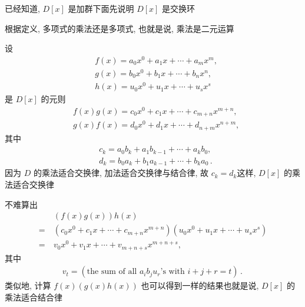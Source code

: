 \begin{pf}
    已经知道, $D[x]$ 是加群\period 下面先说明 $D[x]$ 是交换环\period

    根据定义, 多项式的乘法还是多项式, 也就是说, 乘法是二元运算\period

    设
    \begin{align*}
         & f(x) = a_0 x^0 + a_1 x + \cdots + a_m x^m, \\
         & g(x) = b_0 x^0 + b_1 x + \cdots + b_n x^n, \\
         & h(x) = u_0 x^0 + u_1 x + \cdots + u_s x^s
    \end{align*}
    是 $D[x]$ 的元\period 则
    \begin{align*}
         & f(x) g(x) = c_0 x^0 + c_1 x + \cdots + c_{m+n} x^{m+n}, \\
         & g(x) f(x) = d_0 x^0 + d_1 x + \cdots + d_{n+m} x^{n+m},
    \end{align*}
    其中
    \begin{align*}
         & c_k = a_0 b_k + a_1 b_{k-1} + \cdots + a_k b_0,        \\
         & d_k = b_0 a_k + b_1 a_{k-1} + \cdots + b_k a_0 \period
    \end{align*}
    因为 $D$ 的乘法适合交换律, 加法适合交换律与结合律, 故 $c_k = d_k$\period 这样, $D[x]$ 的乘法适合交换律\period

    不难算出
    \begin{align*}
             & (f(x) g(x)) h(x)                                                                  \\
        = \  & (c_0 x^0 + c_1 x + \cdots + c_{m+n} x^{m+n}) (u_0 x^0 + u_1 x + \cdots + u_s x^s) \\
        = \  & v_0 x^0 + v_1 x + \cdots + v_{m+n+s} x^{m+n+s},
    \end{align*}
    其中
    \begin{align*}
        v_t = (\text{the sum of all $a_i b_j u_r$'s with $i+j+r=t$})\period
    \end{align*}
    类似地, 计算 $f(x) (g(x) h(x))$ 也可以得到一样的结果\period 也就是说, $D[x]$ 的乘法适合结合律\period


\end{pf}

